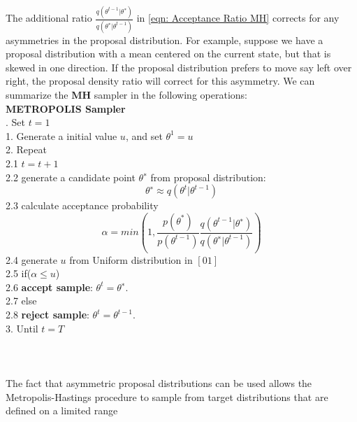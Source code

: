 The additional ratio $\frac{q(\theta^{t-1}|\theta^∗)}{q(\theta^∗ |\theta^{t-1})}$ in  \ref{eqn: Acceptance Ratio MH} corrects for any asymmetries in the proposal distribution. For example, suppose we have a proposal distribution with a mean centered on the current state, but that is skewed in one direction. If the proposal distribution prefers to move say left over right, the proposal density ratio will correct for this asymmetry.
We can summarize the \textbf{MH} sampler in the following operations:\\
{\bf METROPOLIS Sampler}\\[.4cm]
{. \hspace*{0.2cm} Set $t=1$  \\
1. \hspace*{0.2cm} Generate a initial value $u$, and set $\theta^1 = u$\\
2. \hspace*{0.2cm}  Repeat\\
2.1 \hspace*{0.3cm} $t=t+1$\\
2.2 \hspace*{0.3cm} generate a candidate point $\theta^∗$ from proposal distribution:
$$
\theta^∗ \approx q(\theta^t |\theta^{t-1})
$$
2.3 \hspace*{0.3cm} calculate acceptance probability \\
$$
\alpha = min(1, \frac{p(\theta^*)}{p(\theta^{t-1})} \frac{q(\theta^{t-1}|\theta^∗)}{q(\theta^∗ |\theta^{t-1})} )
$$
2.4 \hspace*{0.3cm} generate $u$ from Uniform distribution in $[0 1]$\\
2.5 \hspace*{0.3cm} if($\alpha  \leq u$)\\
2.6 \hspace*{0.4cm}  \textbf{accept sample}: $\theta^t=\theta^∗$.\\
2.7 \hspace*{0.3cm} else\\
2.8 \hspace*{0.4cm}  \textbf{reject sample}: $\theta^t=\theta^{t-1}$.\\
3. \hspace*{0.2cm} Until $t = T$\\
}\\[.4cm]
\\
\\
The fact that asymmetric proposal distributions can be used allows the Metropolis-Hastings procedure to sample from target distributions that are defined on a limited range
